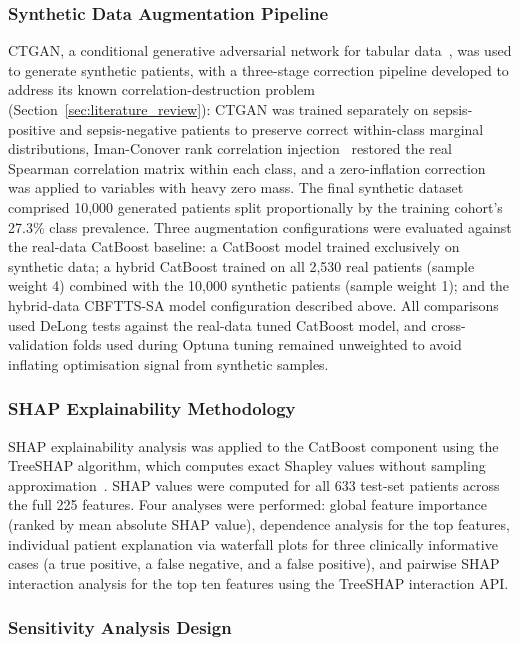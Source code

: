 \documentclass[final,3p,times]{elsarticle}
\begin{document}
\subsubsection{Synthetic Data Augmentation Pipeline}
\label{subsec:synthetic_methods}

CTGAN, a conditional generative adversarial network for tabular
data~\cite{xu2019}, was used to generate synthetic patients, with a
three-stage correction pipeline developed to address its known
correlation-destruction problem (Section~\ref{sec:literature_review}):
CTGAN was trained separately on sepsis-positive and sepsis-negative
patients to preserve correct within-class marginal distributions,
Iman-Conover rank correlation injection~\cite{iman1982} restored the
real Spearman correlation matrix within each class, and a
zero-inflation correction was applied to variables with heavy zero
mass. The final synthetic dataset comprised 10,000 generated
patients split proportionally by the training cohort's 27.3\% class
prevalence. Three augmentation configurations were evaluated against
the real-data CatBoost baseline: a CatBoost model trained exclusively
on synthetic data; a hybrid CatBoost trained on all 2,530 real
patients (sample weight 4) combined with the 10,000 synthetic
patients (sample weight 1); and the hybrid-data CBFTTS-SA model configuration
described above. All comparisons used DeLong tests against the
real-data tuned CatBoost model, and cross-validation folds used
during Optuna tuning remained unweighted to avoid inflating
optimisation signal from synthetic samples.

\subsubsection{SHAP Explainability Methodology}
\label{subsec:shap_methods}

SHAP explainability analysis was applied to the CatBoost component
using the TreeSHAP algorithm, which computes exact Shapley values
without sampling approximation~\cite{lundberg2017}. SHAP values were
computed for all 633 test-set patients across the full 225 features.
Four analyses were performed: global feature importance (ranked by
mean absolute SHAP value), dependence analysis for the top features,
individual patient explanation via waterfall plots for three
clinically informative cases (a true positive, a false negative, and
a false positive), and pairwise SHAP interaction analysis for the top
ten features using the TreeSHAP interaction API.

\subsubsection{Sensitivity Analysis Design}
\label{subsec:sensitivity_methods}
\end{document}
